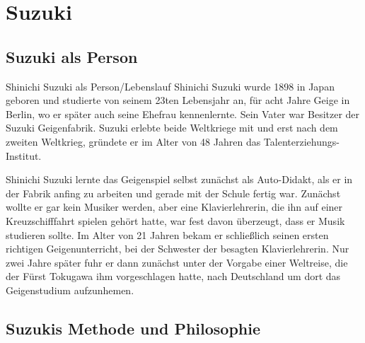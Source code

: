\section{Suzuki}

\subsection{Suzuki als Person} Shinichi Suzuki als Person/Lebenslauf
Shinichi Suzuki wurde 1898 in Japan geboren und studierte
von seinem 23ten Lebensjahr an, für acht Jahre Geige
in Berlin, wo er später auch seine Ehefrau kennenlernte. Sein
Vater war Besitzer der Suzuki Geigenfabrik. Suzuki erlebte beide Weltkriege mit und erst nach
dem zweiten Weltkrieg, gründete er im Alter von 48 Jahren das
Talenterziehungs-Institut. 

Shinichi Suzuki lernte das Geigenspiel selbst zunächst als Auto-Didakt, als er in der Fabrik
anfing zu arbeiten und gerade mit der Schule fertig war. Zunächst wollte er gar
kein Musiker werden, aber eine Klavierlehrerin, die ihn auf einer
Kreuzschifffahrt spielen gehört hatte, war fest davon überzeugt, dass er Musik studieren
sollte. \autocite[89]{suzuki:erziehung_ist_liebe}
Im Alter von 21 Jahren bekam er schließlich seinen ersten richtigen Geigenunterricht, bei der Schwester
der besagten Klavierlehrerin. Nur zwei Jahre später fuhr er dann zunächst unter der Vorgabe einer Weltreise, die der
Fürst Tokugawa ihm vorgeschlagen hatte, nach Deutschland um dort das Geigenstudium aufzunhemen. \autocite[90ff]{suzuki:erziehung_ist_liebe}

\subsection{Suzukis Methode und Philosophie}

